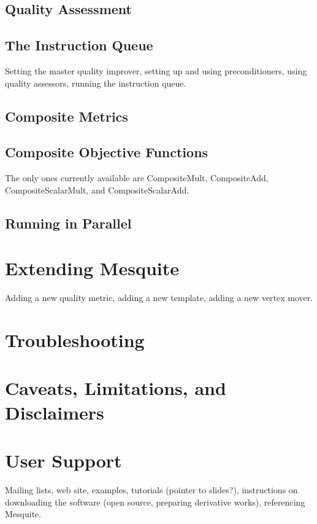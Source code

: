\subsection{Quality Assessment}

\subsection{The Instruction Queue}
Setting the master quality improver, setting up and using preconditioners,
using quality assessors, running the instruction queue.

\subsection{Composite Metrics}

\subsection{Composite Objective Functions}
The only ones currently available are CompositeMult, CompositeAdd,
CompositeScalarMult, and CompositeScalarAdd.

\subsection{Running in Parallel}

\section{Extending Mesquite}
Adding a new quality metric, adding a new template, adding a new vertex 
mover.

\section{Troubleshooting}

\section{Caveats, Limitations, and Disclaimers}

\section{User Support}
Mailing lists, web site, examples, tutorials (pointer to slides?), 
instructions on downloading the software (open source, preparing 
derivative works), referencing Mesquite.

